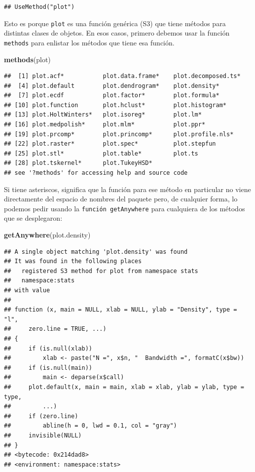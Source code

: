 \documentclass[]{article}
\newenvironment{Shaded}{\begin{snugshade}}{\end{snugshade}}
\newcommand{\KeywordTok}[1]{\textcolor[rgb]{0.13,0.29,0.53}{\textbf{#1}}}
\newcommand{\NormalTok}[1]{#1}
\begin{document}
\begin{verbatim}
## UseMethod("plot")
\end{verbatim}

Esto es porque \texttt{plot} es una función genérica (S3) que tiene
métodos para distintas clases de objetos. En esos casos, primero debemos
usar la función \texttt{methods} para enlistar los métodos que tiene esa
función.

\begin{Shaded}
\begin{Highlighting}[]
\KeywordTok{methods}\NormalTok{(plot)}
\end{Highlighting}
\end{Shaded}

\begin{verbatim}
##  [1] plot.acf*           plot.data.frame*    plot.decomposed.ts*
##  [4] plot.default        plot.dendrogram*    plot.density*      
##  [7] plot.ecdf           plot.factor*        plot.formula*      
## [10] plot.function       plot.hclust*        plot.histogram*    
## [13] plot.HoltWinters*   plot.isoreg*        plot.lm*           
## [16] plot.medpolish*     plot.mlm*           plot.ppr*          
## [19] plot.prcomp*        plot.princomp*      plot.profile.nls*  
## [22] plot.raster*        plot.spec*          plot.stepfun       
## [25] plot.stl*           plot.table*         plot.ts            
## [28] plot.tskernel*      plot.TukeyHSD*     
## see '?methods' for accessing help and source code
\end{verbatim}

Si tiene asteriscos, significa que la función para ese método en
particular no viene directamente del espacio de nombres del paquete
pero, de cualquier forma, lo podemos pedir usando la
\texttt{función\ getAnywhere} para cualquiera de los métodos que se
desplegaron:

\begin{Shaded}
\begin{Highlighting}[]
\KeywordTok{getAnywhere}\NormalTok{(plot.density)}
\end{Highlighting}
\end{Shaded}

\begin{verbatim}
## A single object matching 'plot.density' was found
## It was found in the following places
##   registered S3 method for plot from namespace stats
##   namespace:stats
## with value
## 
## function (x, main = NULL, xlab = NULL, ylab = "Density", type = "l", 
##     zero.line = TRUE, ...) 
## {
##     if (is.null(xlab)) 
##         xlab <- paste("N =", x$n, "  Bandwidth =", formatC(x$bw))
##     if (is.null(main)) 
##         main <- deparse(x$call)
##     plot.default(x, main = main, xlab = xlab, ylab = ylab, type = type, 
##         ...)
##     if (zero.line) 
##         abline(h = 0, lwd = 0.1, col = "gray")
##     invisible(NULL)
## }
## <bytecode: 0x214dad8>
## <environment: namespace:stats>
\end{verbatim}
\end{document}
